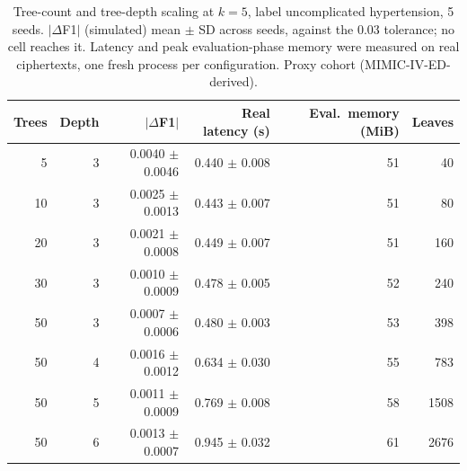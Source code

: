 \begin{table}[t]
\centering
\caption{Tree-count and tree-depth scaling at $k=5$, label uncomplicated hypertension, 5 seeds. $|\Delta$F1$|$ (simulated) mean $\pm$ SD across seeds, against the 0.03 tolerance; no cell reaches it. Latency and peak evaluation-phase memory were measured on real ciphertexts, one fresh process per configuration. Proxy cohort (MIMIC-IV-ED-derived).}
\label{tab:t6_scaling}
\begin{tabular}{rrrrrr}
\toprule
Trees & Depth & $|\Delta$F1$|$ & Real latency (s) & Eval.\ memory (MiB) & Leaves \\
\midrule
5 & 3 & 0.0040 $\pm$ 0.0046 & 0.440 $\pm$ 0.008 & 51 & 40 \\
10 & 3 & 0.0025 $\pm$ 0.0013 & 0.443 $\pm$ 0.007 & 51 & 80 \\
20 & 3 & 0.0021 $\pm$ 0.0008 & 0.449 $\pm$ 0.007 & 51 & 160 \\
30 & 3 & 0.0010 $\pm$ 0.0009 & 0.478 $\pm$ 0.005 & 52 & 240 \\
50 & 3 & 0.0007 $\pm$ 0.0006 & 0.480 $\pm$ 0.003 & 53 & 398 \\
50 & 4 & 0.0016 $\pm$ 0.0012 & 0.634 $\pm$ 0.030 & 55 & 783 \\
50 & 5 & 0.0011 $\pm$ 0.0009 & 0.769 $\pm$ 0.008 & 58 & 1508 \\
50 & 6 & 0.0013 $\pm$ 0.0007 & 0.945 $\pm$ 0.032 & 61 & 2676 \\
\bottomrule
\end{tabular}
\end{table}
